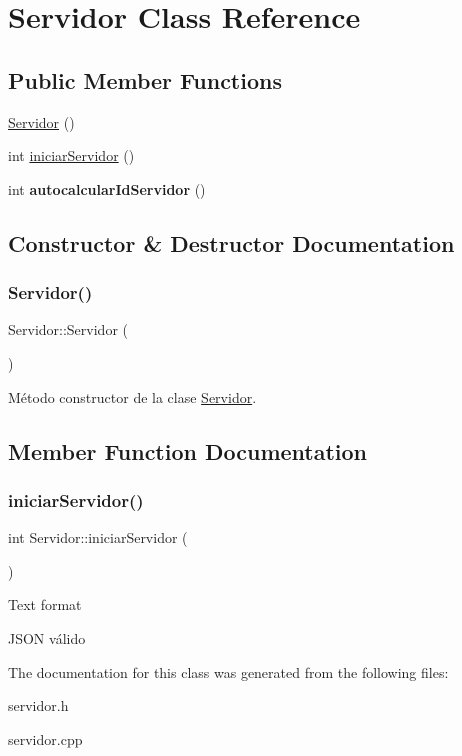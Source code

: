 \hypertarget{classServidor}{}\section{Servidor Class Reference}
\label{classServidor}
\subsection*{Public Member Functions}
\begin{DoxyCompactItemize}
\item 
\mbox{\hyperlink{classServidor_a6be6f59fd470098d8d79bfa22c378b81}{Servidor}} ()
\item 
int \mbox{\hyperlink{classServidor_a2a7fdca08064f9e567c579a2cb34f267}{iniciar\+Servidor}} ()
\item 
\mbox{\label{classServidor_a292f87f595ed2afd654abe3cc5ba8dc0}} 
int {\bfseries autocalcular\+Id\+Servidor} ()
\end{DoxyCompactItemize}


\subsection{Constructor \& Destructor Documentation}
\mbox{\label{classServidor_a6be6f59fd470098d8d79bfa22c378b81}} 
\subsubsection{\texorpdfstring{Servidor()}{Servidor()}}
{\footnotesize\ttfamily Servidor\+::\+Servidor (\begin{DoxyParamCaption}{ }\end{DoxyParamCaption})}

Método constructor de la clase \mbox{\hyperlink{classServidor}{Servidor}}. 

\subsection{Member Function Documentation}
\mbox{\label{classServidor_a2a7fdca08064f9e567c579a2cb34f267}} 
\subsubsection{\texorpdfstring{iniciar\+Servidor()}{iniciarServidor()}}
{\footnotesize\ttfamily int Servidor\+::iniciar\+Servidor (\begin{DoxyParamCaption}{ }\end{DoxyParamCaption})}

Text format

J\+S\+ON válido 

The documentation for this class was generated from the following files\+:\begin{DoxyCompactItemize}
\item 
servidor.\+h\item 
servidor.\+cpp\end{DoxyCompactItemize}
